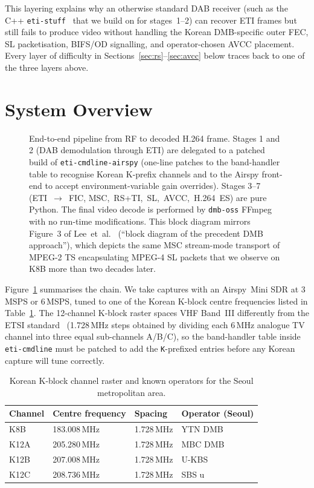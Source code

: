 \documentclass[11pt,a4paper]{article}
\begin{document}
This layering explains why an otherwise standard DAB receiver
(such as the C++ \texttt{eti-stuff}~\cite{etistuff} that we
build on for stages~1--2) can recover ETI frames but still
fails to produce video without handling the Korean
DMB-specific outer FEC, SL packetisation, BIFS/OD signalling,
and operator-chosen AVCC placement.  Every layer of difficulty
in Sections~\ref{sec:rs}--\ref{sec:avcc} below traces back to
one of the three layers above.

\section{System Overview}\label{sec:system}

\begin{figure}[t]
\centering

\caption{End-to-end pipeline from RF to decoded H.264 frame.  Stages 1
and 2 (DAB demodulation through ETI) are delegated to a patched build
of \texttt{eti-cmdline-airspy} (one-line patches to the band-handler
table to recognise Korean K-prefix channels and to the Airspy front-end
to accept environment-variable gain overrides).  Stages 3--7
(ETI~$\rightarrow$~FIC,
MSC,~RS+TI,~SL,~AVCC,~H.264~ES) are pure Python.  The final video
decode is performed by \texttt{dmb-oss} FFmpeg with no run-time
modifications.  This block diagram mirrors Figure~3 of
Lee~et~al.~\cite{lee2004m4smux} (``block diagram of the precedent DMB
approach''), which depicts the same MSC stream-mode transport of MPEG-2
TS encapsulating MPEG-4 SL packets that we observe on K8B more than two
decades later.}
\label{fig:pipeline}
\end{figure}

Figure~\ref{fig:pipeline} summarises the chain.  We take captures with
an Airspy~Mini SDR at 3\,MSPS or 6\,MSPS, tuned to one of the Korean
K-block centre frequencies listed in Table~\ref{tab:k-block}.
The 12-channel K-block raster spaces VHF Band~III differently from the
ETSI standard~\cite{etsi300401} (1.728\,MHz steps obtained by dividing
each 6\,MHz analogue TV channel into three equal sub-channels A/B/C),
so the band-handler table inside \texttt{eti-cmdline} must be patched
to add the \texttt{K}-prefixed entries before any Korean capture
will tune correctly.

\begin{table}[t]
\centering
\caption{Korean K-block channel raster and known operators for the
Seoul metropolitan area.}
\label{tab:k-block}
\begin{tabular}{llll}
\toprule
Channel & Centre frequency & Spacing & Operator (Seoul) \\
\midrule
K8B  & 183.008\,MHz & 1.728\,MHz & YTN DMB \\
K12A & 205.280\,MHz & 1.728\,MHz & MBC DMB \\
K12B & 207.008\,MHz & 1.728\,MHz & U-KBS \\
K12C & 208.736\,MHz & 1.728\,MHz & SBS u \\
\bottomrule
\end{tabular}
\end{table}
\end{document}
